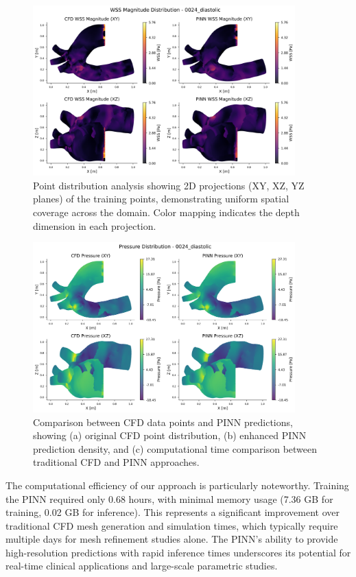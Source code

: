 \documentclass[12pt, a4paper]{article}
\begin{document}
\begin{figure}[htbp]
    \centering
    \includegraphics[width=0.9\textwidth]{0024_diastolic/wss_magnitude_distribution_0024_diastolic.png}
    \caption{Point distribution analysis showing 2D projections (XY, XZ, YZ planes) of the training points, demonstrating uniform spatial coverage across the domain. Color mapping indicates the depth dimension in each projection.}
    \label{fig:mesh_analysis}
\end{figure}

\begin{figure}[htbp]
    \centering
    \includegraphics[width=0.9\textwidth]{0024_diastolic/pressure_distribution_0024_diastolic.png}
    \caption{Comparison between CFD data points and PINN predictions, showing (a) original CFD point distribution, (b) enhanced PINN prediction density, and (c) computational time comparison between traditional CFD and PINN approaches.}
    \label{fig:density_comparison}
\end{figure}

The computational efficiency of our approach is particularly noteworthy. Training the PINN required only 0.68 hours, with minimal memory usage (7.36 GB for training, 0.02 GB for inference). This represents a significant improvement over traditional CFD mesh generation and simulation times, which typically require multiple days for mesh refinement studies alone. The PINN's ability to provide high-resolution predictions with rapid inference times underscores its potential for real-time clinical applications and large-scale parametric studies.
\end{document}
